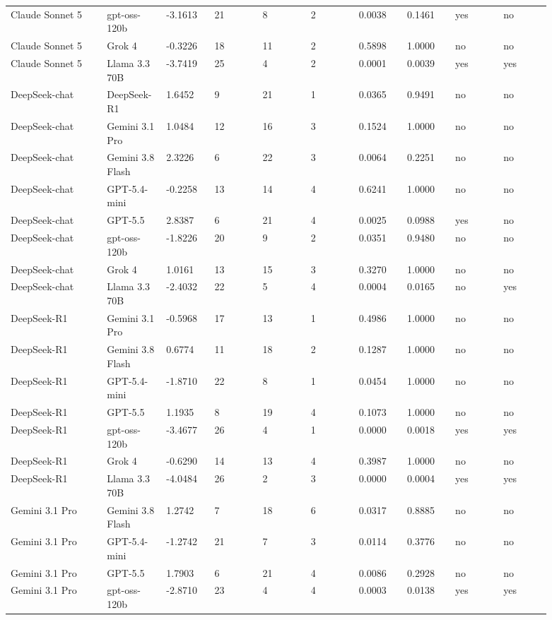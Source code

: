 \begin{landscape}
\begin{longtable}{p{0.162\linewidth}p{0.081\linewidth}p{0.081\linewidth}p{0.081\linewidth}p{0.081\linewidth}p{0.081\linewidth}p{0.081\linewidth}p{0.081\linewidth}p{0.081\linewidth}p{0.081\linewidth}}
Claude Sonnet 5 & gpt-oss-120b & -3.1613 & 21 & 8 & 2 & 0.0038 & 0.1461 & yes & no \\
Claude Sonnet 5 & Grok 4 & -0.3226 & 18 & 11 & 2 & 0.5898 & 1.0000 & no & no \\
Claude Sonnet 5 & Llama 3.3 70B & -3.7419 & 25 & 4 & 2 & 0.0001 & 0.0039 & yes & yes \\
DeepSeek-chat & DeepSeek-R1 & 1.6452 & 9 & 21 & 1 & 0.0365 & 0.9491 & no & no \\
DeepSeek-chat & Gemini 3.1 Pro & 1.0484 & 12 & 16 & 3 & 0.1524 & 1.0000 & no & no \\
DeepSeek-chat & Gemini 3.8 Flash & 2.3226 & 6 & 22 & 3 & 0.0064 & 0.2251 & no & no \\
DeepSeek-chat & GPT-5.4-mini & -0.2258 & 13 & 14 & 4 & 0.6241 & 1.0000 & no & no \\
DeepSeek-chat & GPT-5.5 & 2.8387 & 6 & 21 & 4 & 0.0025 & 0.0988 & yes & no \\
DeepSeek-chat & gpt-oss-120b & -1.8226 & 20 & 9 & 2 & 0.0351 & 0.9480 & no & no \\
DeepSeek-chat & Grok 4 & 1.0161 & 13 & 15 & 3 & 0.3270 & 1.0000 & no & no \\
DeepSeek-chat & Llama 3.3 70B & -2.4032 & 22 & 5 & 4 & 0.0004 & 0.0165 & no & yes \\
DeepSeek-R1 & Gemini 3.1 Pro & -0.5968 & 17 & 13 & 1 & 0.4986 & 1.0000 & no & no \\
DeepSeek-R1 & Gemini 3.8 Flash & 0.6774 & 11 & 18 & 2 & 0.1287 & 1.0000 & no & no \\
DeepSeek-R1 & GPT-5.4-mini & -1.8710 & 22 & 8 & 1 & 0.0454 & 1.0000 & no & no \\
DeepSeek-R1 & GPT-5.5 & 1.1935 & 8 & 19 & 4 & 0.1073 & 1.0000 & no & no \\
DeepSeek-R1 & gpt-oss-120b & -3.4677 & 26 & 4 & 1 & 0.0000 & 0.0018 & yes & yes \\
DeepSeek-R1 & Grok 4 & -0.6290 & 14 & 13 & 4 & 0.3987 & 1.0000 & no & no \\
DeepSeek-R1 & Llama 3.3 70B & -4.0484 & 26 & 2 & 3 & 0.0000 & 0.0004 & yes & yes \\
Gemini 3.1 Pro & Gemini 3.8 Flash & 1.2742 & 7 & 18 & 6 & 0.0317 & 0.8885 & no & no \\
Gemini 3.1 Pro & GPT-5.4-mini & -1.2742 & 21 & 7 & 3 & 0.0114 & 0.3776 & no & no \\
Gemini 3.1 Pro & GPT-5.5 & 1.7903 & 6 & 21 & 4 & 0.0086 & 0.2928 & no & no \\
Gemini 3.1 Pro & gpt-oss-120b & -2.8710 & 23 & 4 & 4 & 0.0003 & 0.0138 & yes & yes \\

\end{longtable}
\end{landscape}
